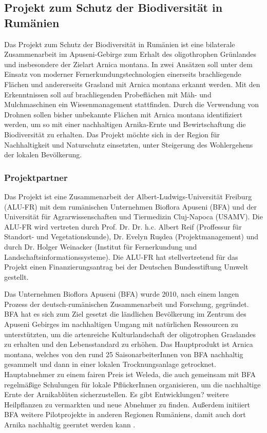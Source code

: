 \subsection{Projekt zum Schutz der Biodiversität in Rumänien}



Das Projekt zum Schutz der Biodiversität in Rumänien ist eine bilaterale Zusammenarbeit im Apuseni-Gebirge zum Erhalt des oligothrophen Grünlandes und insbesondere der Zielart Arnica montana. In zwei Ansätzen soll unter dem Einsatz von moderner Fernerkundungstechnologien einerseits brachliegende Flächen und andererseits Grasland mit Arnica montana erkannt werden. Mit den Erkenntnissen soll auf brachliegenden Probeflächen mit Mäh- und Mulchmaschinen ein Wiesenmanagement stattfinden. Durch die Verwendung von Drohnen sollen bisher unbekannte Flächen mit Arnica montana identifiziert werden, um so mit einer nachhaltigen Arnika-Ernte und Bewirtschaftung die Biodiversität zu erhalten. Das Projekt möchte sich in der Region für Nachhaltigkeit und Naturschutz einsetzten, unter Steigerung des Wohlergehens der lokalen Bevölkerung. 

\subsubsection{Projektpartner}
Das Projekt ist eine Zusammenarbeit der Albert-Ludwigs-Universität Freiburg (ALU-FR) mit dem rumänischen Unternehmen Bioflora Apuseni (BFA) und der Universität für Agrarwissenschaften und Tiermedizin Cluj-Napoca (USAMV). Die ALU-FR wird vertreten durch Prof. Dr. Dr. h.c. Albert Reif (Proffessur für Standort- und Vegetationskunde), Dr. Evelyn Ruşdea  (Projektmanagement) und durch Dr. Holger Weinacker (Institut für Fernerkundung und Landschaftsinformationssysteme). Die ALU-FR hat stellvertretend für das Projekt einen Finanzierungsantrag bei der Deutschen Bundesstiftung Umwelt gestellt.

Das Unternehmen Bioflora Apuseni (BFA) wurde 2010, nach einem langen Prozess der deutsch-rumänischen Zusammenarbeit und Forschung, gegründet. BFA hat es sich zum Ziel gesetzt die ländlichen Bevölkerung im Zentrum des Apuseni Gebirges im nachhaltigen Umgang mit natürlichen Ressourcen zu unterstützten, um die artenreiche Kulturlandschaft der oligotrophen Graslandes zu erhalten und den Lebensstandard zu erhöhen. Das Hauptprodukt ist Arnica montana, welches von den rund 25 SaisonarbeiterInnen von BFA nachhaltig gesammelt und dann in einer lokalen Trocknungsanlage getrocknet. Hauptabnehmer zu einem fairen Preis ist Weleda, die auch gemeinsam mit BFA regelmäßige Schulungen für lokale PflückerInnen organisieren, um die nachhaltige Ernte der Arnikablüten sicherzustellen. Es gibt Entwicklungen? weitere Heilpflanzen zu vermarkten und neue Abnehmer zu finden. Außerdem initiiert BFA weitere Pilotprojekte in anderen Regionen Rumäniens, damit auch dort Arnika nachhaltig geerntet werden kann \citep[vgl.][]{ECOKARST2018,DBU2018}.

